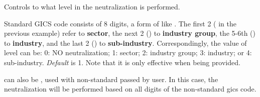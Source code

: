 Controls to what level in  the neutralization is performed.

                 Standard GICS code consists of 8 digits, a form of like .
                 The first 2 ( in the previous example) refer to \textbf{sector},
                 the next 2 () to \textbf{industry group},
                 the 5-6th () to \textbf{industry},
                 and the last 2 () to \textbf{sub-industry}.
                 Correspondingly, the value of level can be:
                 0: NO neutralization;
                 1: sector;
                 2: industry group; 
                 3: industry;
                 or 4: sub-industry.
                 \emph{Default} is 1.
                 Note that it is only effective when  being provided.

                  can also be , 
                 used with non-standard  passed by user.
                 In this case, the neutralization will be performed based on all digits of 
                 the non-standard gics code.
